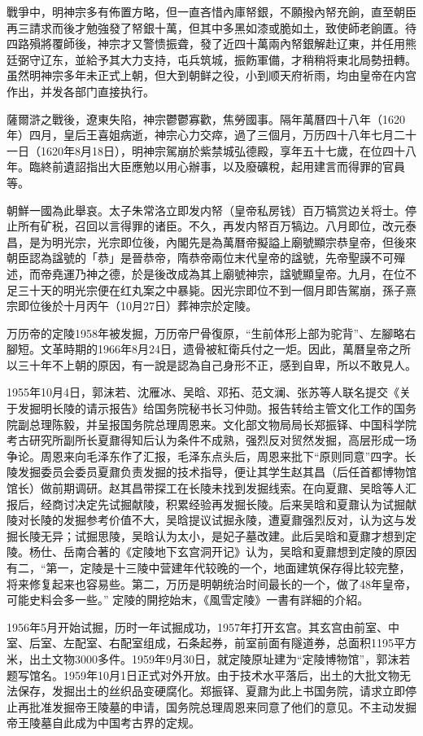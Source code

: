 戰爭中，明神宗多有佈置方略，但一直吝惜內庫帑銀，不願撥內帑充餉，直至朝臣再三請求而後才勉強發了帑銀十萬，但其中多黑如漆或脆如土，致使師老餉匱。待四路殞將覆師後，神宗才又警愦振聋，發了近四十萬兩內帑銀解赴辽東，并任用熊廷弼守辽东，並給予其大力支持，屯兵筑城，振飭軍備，才稍稍将東北局勢扭轉。虽然明神宗多年未正式上朝，但大到朝鲜之役，小到顺天府祈雨，均由皇帝在内宫作出，并发各部门直接执行。

薩爾滸之戰後，遼東失陷，神宗鬱鬱寡歡，焦勞國事。隔年萬曆四十八年（1620年）四月，皇后王喜姐病逝，神宗心力交瘁，過了三個月，万历四十八年七月二十一日（1620年8月18日），明神宗駕崩於紫禁城弘德殿，享年五十七歲，在位四十八年。臨終前遺詔指出大臣應勉以用心辦事，以及廢礦稅，起用建言而得罪的官員等。

朝鮮一國為此舉哀。太子朱常洛立即发内帑（皇帝私房钱）百万犒赏边关将士。停止所有矿税，召回以言得罪的诸臣。不久，再发内帑百万犒边。八月即位，改元泰昌，是为明光宗，光宗即位後，內閣先是為萬曆帝擬謚上廟號顯宗恭皇帝，但後來朝臣認為諡號的「恭」是晉恭帝，隋恭帝兩位末代皇帝的諡號，先帝聖謨不可殫述，而帝堯運乃神之德，於是後改成為其上廟號神宗，諡號顯皇帝。九月，在位不足三十天的明光宗便在红丸案之中暴毙。因光宗即位不到一個月即告駕崩，孫子熹宗即位後於十月丙午（10月27日）葬神宗於定陵。

万历帝的定陵1958年被发掘，万历帝尸骨復原，“生前体形上部为驼背”、左腳略右腳短。文革時期的1966年8月24日，遗骨被紅衛兵付之一炬。因此，萬曆皇帝之所以三十年不上朝的原因，有一說是認為自己身形不正，感到自卑，所以不敢見人。

1955年10月4日，郭沫若、沈雁冰、吴晗、邓拓、范文澜、张苏等人联名提交《关于发掘明长陵的请示报告》给国务院秘书长习仲勋。报告转给主管文化工作的国务院副总理陈毅，并呈报国务院总理周恩来。文化部文物局局长郑振铎、中国科学院考古研究所副所长夏鼐得知后认为条件不成熟，强烈反对贸然发掘，高层形成一场争论。周恩来向毛泽东作了汇报，毛泽东点头后，周恩来批下“原则同意”四字。长陵发掘委员会委员夏鼐负责发掘的技术指导，便让其学生赵其昌（后任首都博物馆馆长）做前期调研。赵其昌带探工在长陵未找到发掘线索。在向夏鼐、吴晗等人汇报后，经商讨决定先试掘献陵，积累经验再发掘长陵。后来吴晗和夏鼐认为试掘献陵对长陵的发掘参考价值不大，吴晗提议试掘永陵，遭夏鼐强烈反对，认为这与发掘长陵无异；试掘思陵，吴晗认为太小，是妃子墓改建。此后吴晗和夏鼐才想到定陵。杨仕、岳南合著的《定陵地下玄宫洞开记》认为，吴晗和夏鼐想到定陵的原因有二，“第一，定陵是十三陵中营建年代较晚的一个，地面建筑保存得比较完整，将来修复起来也容易些。第二，万历是明朝统治时间最长的一个，做了48年皇帝，可能史料会多一些。” 定陵的開挖始末，《風雪定陵》一書有詳細的介紹。

1956年5月开始试掘，历时一年试掘成功，1957年打开玄宫。其玄宫由前室、中室、后室、左配室、右配室组成，石条起券，前室前面有隧道券，总面积1195平方米，出土文物3000多件。1959年9月30日，就定陵原址建为“定陵博物馆”，郭沫若题写馆名。1959年10月1日正式对外开放。由于技术水平落后，出土的大批文物无法保存，发掘出土的丝织品变硬腐化。郑振铎、夏鼐为此上书国务院，请求立即停止再批准发掘帝王陵墓的申请，国务院总理周恩来同意了他们的意见。不主动发掘帝王陵墓自此成为中国考古界的定规。

